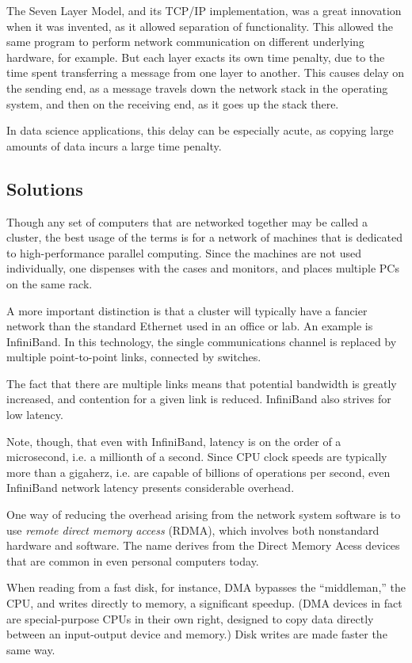 The Seven Layer Model, and its TCP/IP implementation, was a great
innovation when it was invented, as it allowed separation of
functionality.  This allowed the same program to perform network
communication on different underlying hardware, for example.  But each
layer exacts its own time penalty, due to the time spent transferring a
message from one layer to another.  This causes delay on the sending
end, as a message travels down the network stack in the operating
system, and then on the receiving end, as it goes up the stack there.

In data science applications, this delay can be especially acute, as
copying large amounts of data incurs a large time penalty.


\subsection{Solutions}

Though any set of computers that are networked together may be called a
cluster, the best usage of the terms is for a network of machines that
is dedicated to high-performance parallel computing.  Since the machines
are not used individually, one dispenses with the cases and monitors,
and places multiple PCs on the same rack.

A more important distinction is that a cluster will typically have a
fancier network than the standard Ethernet used in an office or lab.  An
example is InfiniBand.  In this technology, the single communications
channel is replaced by multiple point-to-point links, connected by
switches.

The fact that there are multiple links means that potential bandwidth is
greatly increased, and contention for a given link is reduced.
InfiniBand also strives for low latency.  

Note, though, that even with InfiniBand, latency is on the order of a
microsecond, i.e. a millionth of a second.  Since CPU clock speeds are
typically more than a gigaherz, i.e. are capable of billions of
operations per second, even InfiniBand network latency presents
considerable overhead.

One way of reducing the overhead arising from the network system
software is to use {\it remote direct memory access} (RDMA), which
involves both nonstandard hardware and software.  The name derives from
the Direct Memory Acess devices that are common in even personal computers
today.  

When reading from a fast disk, for instance, DMA bypasses the
``middleman,'' the CPU, and writes directly to memory, a significant
speedup.  (DMA devices in fact are special-purpose CPUs in their own
right, designed to copy data directly between an input-output device and
memory.) Disk writes are made faster the same way.

